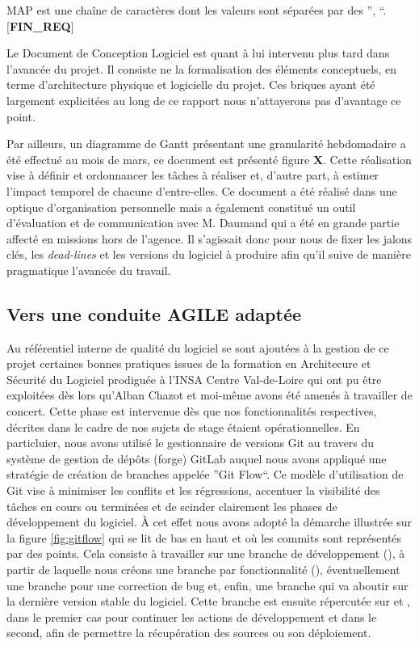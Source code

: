     \hspace{10mm} MAP est une chaîne de caractères dont les valeurs sont séparées par des '', ``.\\ 
  \textbf{$[$FIN\_REQ$]$}
  
  Le Document de Conception Logiciel est quant à lui intervenu plus tard dans l'avancée du projet. 
  Il consiste ne la formalisation des éléments conceptuels, en terme d'architecture physique et logicielle du projet. 
  Ces briques ayant été largement explicitées au long de ce rapport nous n'attayerons pas d'avantage ce point. 
  
  Par ailleurs, un diagramme de Gantt présentant une granularité hebdomadaire a été effectué au mois de mars, ce document est présenté figure \textbf{X}.
  Cette réalisation vise à définir et ordonnancer les tâches à réaliser et, d'autre part, à estimer l'impact temporel de chacune d'entre-elles. 
  Ce document a été réalisé dans une optique d'organisation personnelle mais a également constitué un outil d'évaluation et de communication avec M. Daumand qui a été en grande partie affecté en missions hors de l'agence. 
  Il s'agissait donc pour nous de fixer les jalons clés, les \emph{dead-lines} et les versions du logiciel à produire afin qu'il suive de manière pragmatique l'avancée du travail. 
  
  \subsection{Vers une conduite AGILE adaptée}
  
  Au référentiel interne de qualité du logiciel se sont ajoutées à la gestion de ce projet certaines bonnes pratiques issues de la formation en Architecure et Sécurité du Logiciel prodiguée à l'INSA Centre Val-de-Loire
  qui ont pu être exploitées dès lors qu'Alban Chazot et moi-même avons été amenés à travailler de concert.
  Cette phase est intervenue dès que nos fonctionnalités respectives, décrites dans le cadre de nos sujets de stage étaient opérationnelles.  
  En particluier, nous avons utilisé le gestionnaire de versions Git au travers du système de gestion de dépôts (forge) GitLab auquel nous avons appliqué une stratégie de création de branches appelée ''Git Flow``.
  Ce modèle d'utilisation de Git vise à minimiser les conflits et les régressions, accentuer la visibilité des tâches en cours ou terminées et de scinder clairement les phases de développement du logiciel. 
  \`{A} cet effet nous avons adopté la démarche illustrée sur la figure \ref{fig:gitflow} qui se lit de bas en haut et où les commits sont représentés par des points.
  Cela consiste à travailler sur une branche de développement (), à partir de laquelle nous créons une branche par fonctionnalité (), éventuellement une branche  pour une correction de bug
  et, enfin, une branche  qui va aboutir sur la dernière version stable du logiciel.
  Cette branche est ensuite répercutée sur  et , dans le premier cas  pour continuer les actions de développement et dans le second, afin de permettre la récupération des sources ou son déploiement. 
  
